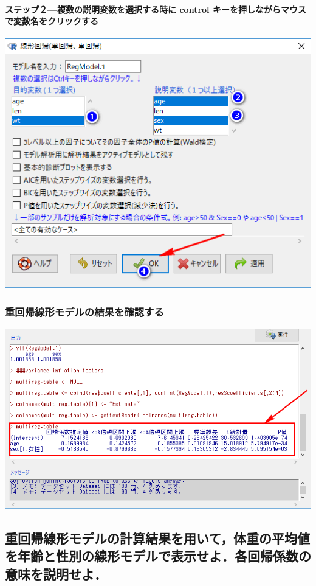 \documentclass[]{problemset}
\let\oldparagraph\paragraph
\renewcommand{\paragraph}[1]{\oldparagraph{#1}\mbox{}}
\begin{document}
\newpage
\vfill

\hypertarget{-control-}{%
\paragraph{ステップ２---複数の説明変数を選択する時に control
キーを押しながらマウスで変数名をクリックする}\label{-control-}}

\begin{center}\includegraphics[width=0.6\linewidth]{pic/lm04} \end{center}

\subsubsection{重回帰線形モデルの結果を確認する}

\begin{center}\includegraphics[width=0.8\linewidth]{pic/lm05} \end{center}

\subsection{重回帰線形モデルの計算結果を用いて，体重の平均値を年齢と性別の線形モデルで表示せよ．各回帰係数の意味を説明せよ．}
\end{document}
